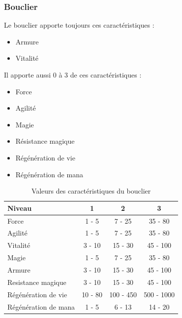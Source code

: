 \documentclass[11pt, a4paper, oneside]{report}
\begin{document}
\subsubsection{Bouclier}
Le bouclier apporte toujours ces caractéristiques :
\begin{multicols}{2}
\begin{itemize}
	\item Armure
	\item Vitalité
\end{itemize}
\end{multicols}
Il apporte aussi 0 à 3 de ces caractéristiques :
\begin{multicols}{2}
\begin{itemize}
    \item Force
    \item Agilité
    \item Magie
    \item Résistance magique
    \item Régénération de vie
    \item Régénération de mana
\end{itemize}
\end{multicols}
\begin{table}[ht]
\begin{center}
\begin{tabular}{| l | c | c | c |}
  \hline      
  Niveau 				& 1 & 2 & 3\\ \hline \hline                 
  Force 				& 1 - 5 & 7 - 25 & 35 - 80\\ \hline
  Agilité 				& 1 - 5 & 7 - 25 & 35 - 80\\ \hline
  Vitalité 				& 3 - 10 & 15 - 30 & 45 - 100\\ \hline
  Magie 				& 1 - 5 & 7 - 25 & 35 - 80\\ \hline
  Armure 				& 3 - 10 & 15 - 30 & 45 - 100\\ \hline
  Resistance magique 	& 3 - 10 & 15 - 30 & 45 - 100\\ \hline
  Régénération de vie 	& 10 - 80  & 100 - 450 & 500 - 1000\\ \hline
  Régénération de mana 	& 1 - 5  & 6 - 13 & 14 - 20\\ \hline
\end{tabular}
\caption{Valeurs des caractéristiques du bouclier}
\end{center}
\end{table}
\end{document}
